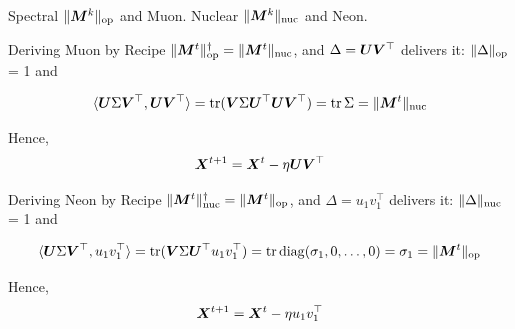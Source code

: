 \documentclass[aspectratio=169]{beamer}
\DeclarePairedDelimiter{\norms}{\|}{\|_{\mathrm{op}}}
\DeclarePairedDelimiter{\normn}{\|}{\|_{\mathrm{nuc}}}
\def\<#1,#2>{\langle #1,#2\rangle}
\DeclareMathOperator{\tr}{tr}
\DeclareMathOperator{\diag}{diag}
\begin{document}
\begin{frame}{Spectral $\norms{\mM^{k}}$ and Muon. Nuclear $\normn{\mM^k}$ and Neon.}
\begin{block}{Deriving Muon by Recipe} $\norms{\mM^t}^\dagger = \normn{\mM^t}$, and $\Delta = {\bm{U}}{\bm{V}}^\top$ delivers it: $\norms{\Delta}$ = 1 and

$$\<\mU\Sigma\mV^\top, \mU\mV^\top> = \tr(\mV \Sigma \mU^\top \mU \mV^\top) = \tr\Sigma = \normn{\mM^t}$$

Hence,
$${\bm{X}}^{t+1} = {\bm{X}}^{t} - \eta {\bm{U}} {\bm{V}}^\top$$

\end{block}

\begin{block}{Deriving Neon by Recipe} $\normn{\mM^t}^\dagger = \norms{\mM^t}$, and $\Delta = u_1 v_1^\top$ delivers it: $\normn{\Delta}$ = 1 and

$$\<\mU\Sigma\mV^\top, u_1 v_1^\top> = \tr(\mV \Sigma \mU^\top u_1 v_1^\top) = \tr\diag({\sigma_1, 0, \dots, 0}) = \sigma_1 = \norms{\mM^t}$$

Hence,
$${\bm{X}}^{t+1} = {\bm{X}}^{t} - \eta u_1 v_1^\top$$
\end{block}
\end{frame}
\end{document}

